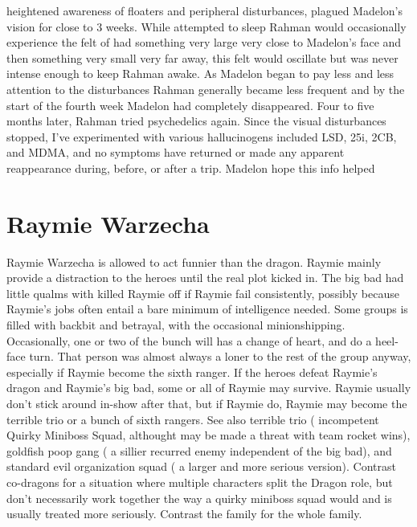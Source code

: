\documentclass[12pt]{book}
\begin{document}
heightened awareness of floaters and peripheral disturbances, plagued Madelon's vision for close to 3 weeks. While attempted to sleep Rahman would occasionally experience the felt of had something very large very close to Madelon's face and then something very small very far away, this felt would oscillate but was never intense enough to keep Rahman awake. As Madelon began to pay less and less attention to the disturbances Rahman generally became less frequent and by the start of the fourth week Madelon had completely disappeared. Four to five months later, Rahman tried psychedelics again. Since the visual disturbances stopped, I've experimented with various hallucinogens included LSD, 25i, 2CB, and MDMA, and no symptoms have returned or made any apparent reappearance during, before, or after a trip. Madelon hope this info helped



\chapter{Raymie Warzecha}

Raymie Warzecha is allowed to act funnier than the dragon. Raymie mainly provide a distraction to the heroes until the real plot kicked in. The big bad had little qualms with killed Raymie off if Raymie fail consistently, possibly because Raymie's jobs often entail a bare minimum of intelligence needed. Some groups is filled with backbit and betrayal, with the occasional minionshipping. Occasionally, one or two of the bunch will has a change of heart, and do a heel-face turn. That person was almost always a loner to the rest of the group anyway, especially if Raymie become the sixth ranger. If the heroes defeat Raymie's dragon and Raymie's big bad, some or all of Raymie may survive. Raymie usually don't stick around in-show after that, but if Raymie do, Raymie may become the terrible trio or a bunch of sixth rangers. See also terrible trio ( incompetent Quirky Miniboss Squad, althought may be made a threat with team rocket wins), goldfish poop gang ( a sillier recurred enemy independent of the big bad), and standard evil organization squad ( a larger and more serious version). Contrast co-dragons for a situation where multiple characters split the Dragon role, but don't necessarily work together the way a quirky miniboss squad would and is usually treated more seriously. Contrast the family for the whole family.
\end{document}
